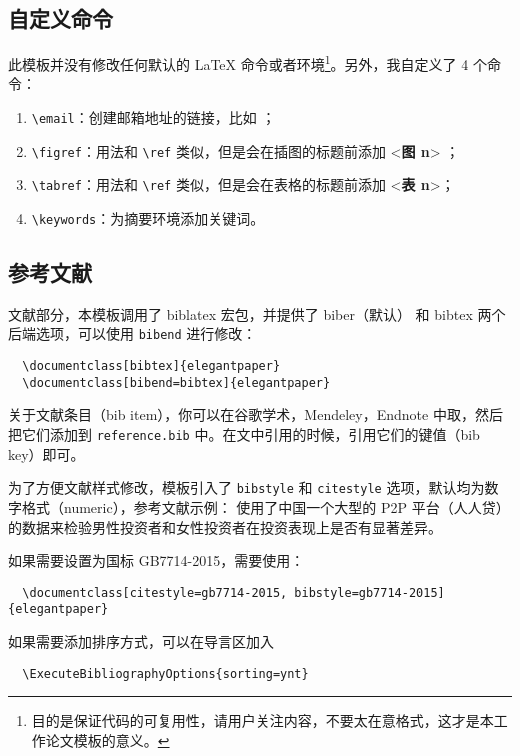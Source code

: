 \documentclass[lang=cn,a4paper]{elegantpaper}
\begin{document}
\subsection{自定义命令}
此模板并没有修改任何默认的 \LaTeX{} 命令或者环境\footnote{目的是保证代码的可复用性，请用户关注内容，不要太在意格式，这才是本工作论文模板的意义。}。另外，我自定义了 4 个命令：
\begin{enumerate}
  \item \lstinline{\email}：创建邮箱地址的链接，比如 ；
  \item \lstinline{\figref}：用法和 \lstinline{\ref} 类似，但是会在插图的标题前添加 <\textbf{图 n}> ；
  \item \lstinline{\tabref}：用法和 \lstinline{\ref} 类似，但是会在表格的标题前添加 <\textbf{表 n}>；
  \item \lstinline{\keywords}：为摘要环境添加关键词。
\end{enumerate}

\subsection{参考文献}

文献部分，本模板调用了 biblatex 宏包，并提供了 biber（默认） 和 bibtex 两个后端选项，可以使用 \lstinline{bibend} 进行修改：

\begin{lstlisting}
  \documentclass[bibtex]{elegantpaper}
  \documentclass[bibend=bibtex]{elegantpaper}
\end{lstlisting}

关于文献条目（bib item），你可以在谷歌学术，Mendeley，Endnote 中取，然后把它们添加到 \lstinline{reference.bib} 中。在文中引用的时候，引用它们的键值（bib key）即可。

为了方便文献样式修改，模板引入了 \lstinline{bibstyle} 和 \lstinline{citestyle} 选项，默认均为数字格式（numeric），参考文献示例：\cite{cn1,en2,en3} 使用了中国一个大型的 P2P 平台（人人贷）的数据来检验男性投资者和女性投资者在投资表现上是否有显著差异。

如果需要设置为国标 GB7714-2015，需要使用：
\begin{lstlisting}
  \documentclass[citestyle=gb7714-2015, bibstyle=gb7714-2015]{elegantpaper} 
\end{lstlisting}

如果需要添加排序方式，可以在导言区加入
\begin{lstlisting}
  \ExecuteBibliographyOptions{sorting=ynt}
\end{lstlisting}
\end{document}
